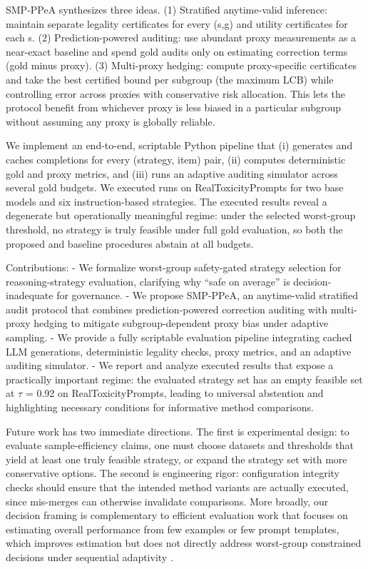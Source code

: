 \documentclass{article} %
\begin{document}
SMP-PPeA synthesizes three ideas. (1) Stratified anytime-valid inference: maintain separate legality certificates for every (s,g) and utility certificates for each s. (2) Prediction-powered auditing: use abundant proxy measurements as a near-exact baseline and spend gold audits only on estimating correction terms (gold minus proxy). (3) Multi-proxy hedging: compute proxy-specific certificates and take the best certified bound per subgroup (the maximum LCB) while controlling error across proxies with conservative risk allocation. This lets the protocol benefit from whichever proxy is less biased in a particular subgroup without assuming any proxy is globally reliable.

We implement an end-to-end, scriptable Python pipeline that (i) generates and caches completions for every (strategy, item) pair, (ii) computes deterministic gold and proxy metrics, and (iii) runs an adaptive auditing simulator across several gold budgets. We executed runs on RealToxicityPrompts for two base models and six instruction-based strategies. The executed results reveal a degenerate but operationally meaningful regime: under the selected worst-group threshold, no strategy is truly feasible under full gold evaluation, so both the proposed and baseline procedures abstain at all budgets.

Contributions:
- We formalize worst-group safety-gated strategy selection for reasoning-strategy evaluation, clarifying why “safe on average” is decision-inadequate for governance.
- We propose SMP-PPeA, an anytime-valid stratified audit protocol that combines prediction-powered correction auditing with multi-proxy hedging to mitigate subgroup-dependent proxy bias under adaptive sampling.
- We provide a fully scriptable evaluation pipeline integrating cached LLM generations, deterministic legality checks, proxy metrics, and an adaptive auditing simulator.
- We report and analyze executed results that expose a practically important regime: the evaluated strategy set has an empty feasible set at \ensuremath{\tau} = 0.92 on RealToxicityPrompts, leading to universal abstention and highlighting necessary conditions for informative method comparisons.

Future work has two immediate directions. The first is experimental design: to evaluate sample-efficiency claims, one must choose datasets and thresholds that yield at least one truly feasible strategy, or expand the strategy set with more conservative options. The second is engineering rigor: configuration integrity checks should ensure that the intended method variants are actually executed, since mis-merges can otherwise invalidate comparisons. More broadly, our decision framing is complementary to efficient evaluation work that focuses on estimating overall performance from few examples or few prompt templates, which improves estimation but does not directly address worst-group constrained decisions under sequential adaptivity \cite{polo-2024-tinybenchmarks,polo-2024-efficient}.
\end{document}
